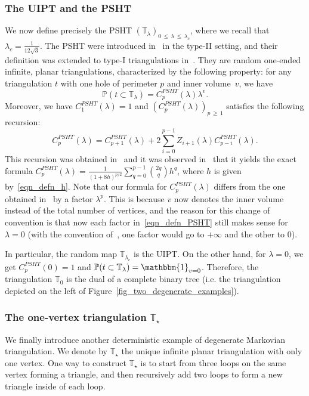 \documentclass[10pt]{amsart}
\theoremstyle{definition}\newtheorem{defi}[theo]{Definition}\newtheorem{rema}[theo]{Remark}\newtheorem{exam}[theo]{Example}\newtheorem{exem}[theo]{Example}\newtheorem{nota}[theo]{Notation}
\newcommand{\TT}{\mathbb{T}}
\renewcommand{\P}{\mathbb{P}}
\newcommand{\bbmun}{\mathbbm{1}}
\begin{document}
\subsubsection*{The UIPT and the PSHT}
We now define precisely the PSHT $(\TT_{\lambda})_{0\,\leq\,\lambda\,\leq\,\lambda_c}$, where we recall that $\lambda_c=\frac{1}{12\sqrt{3}}$. The PSHT were introduced in~\cite{CurPSHIT} in the type-II setting, and their definition was extended to type-I triangulations in~\cite{B16}. They are random one-ended infinite, planar triangulations, characterized by the following property: for any triangulation $t$ with one hole of perimeter $p$ and inner volume~$v$, we have
\begin{equation}\label{eqn_defn_PSHT}
\P \left(t \subset \TT_{\lambda} \right) = C_p^{PSHT}(\lambda) \lambda^{v}.
\end{equation}
Moreover, we have $C_1^{PSHT}(\lambda)=1$ and $(C_p^{PSHT}(\lambda))_{p\,\geq\,1}$ satisfies the following recursion:
\begin{equation}\label{eqn_Cp_psht}
C_p^{PSHT}(\lambda) = C_{p+1}^{PSHT}(\lambda) + 2 \sum_{i=0}^{p-1} Z_{i+1}(\lambda) C_{p-i}^{PSHT}(\lambda).
\end{equation}
This recursion was obtained in~\cite{CurPSHIT} and it was observed in~\cite{B16} that it yields the exact formula $C_p^{PSHT}(\lambda)=\frac{1}{(1+8h)^{p/2}} \sum_{q=0}^{p-1} \binom{2q}{q} h^q$, where $h$ is given by~\eqref{eqn_defn_h}. Note that our formula for $C_p^{PSHT}(\lambda)$ differs from the one obtained in~\cite{B16} by a factor $\lambda^p$. This is because $v$ now denotes the inner volume instead of the total number of vertices, and the reason for this change of convention is that now each factor in~\eqref{eqn_defn_PSHT} still makes sense for $\lambda=0$ (with the convention of~\cite{B16}, one factor would go to $+\infty$ and the other to $0$).

In particular, the random map $\TT_{\lambda_c}$ is the UIPT. On the other hand, for $\lambda=0$, we get $C_p^{PSHT}(0)=1$ and $\P (t \subset \TT_{\lambda} )=\bbmun_{v=0}$. Therefore, the triangulation $\TT_0$ is the dual of a complete binary tree (i.e. the triangulation depicted on the left of Figure~\ref{fig_two_degenerate_examples}).

\subsubsection*{The one-vertex triangulation $\TT_{\star}$}
We finally introduce another deterministic example of degenerate Markovian triangulation. We denote by $\TT_{\star}$ the unique infinite planar triangulation with only one vertex. One way to construct $\TT_{\star}$ is to start from three loops on the same vertex forming a triangle, and then recursively add two loops to form a new triangle inside of each loop.
\end{document}
